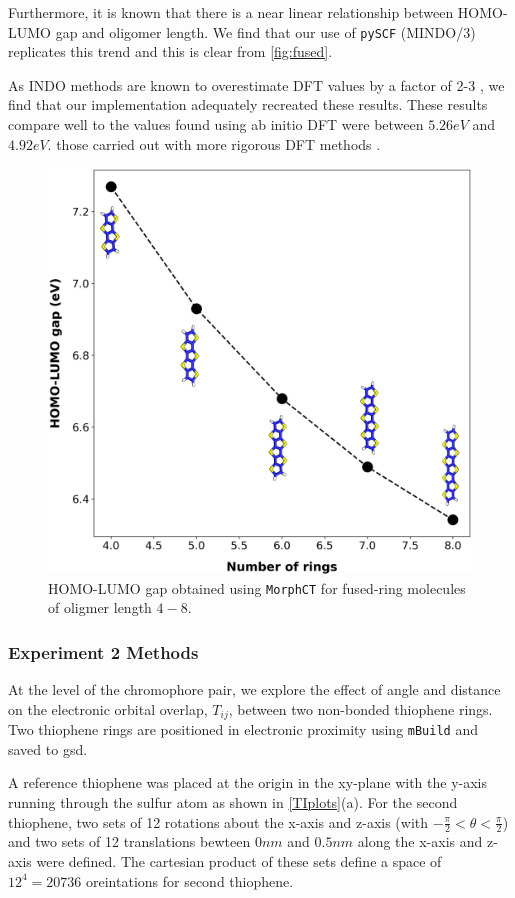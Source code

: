 Furthermore, it is known that there is a near linear
relationship between HOMO-LUMO gap and oligomer length. We find that our use of \texttt{pySCF} (MINDO/3) replicates
this trend and this is clear from \autoref{fig:fused}.

As INDO methods are known to overestimate DFT values by a factor of 2-3 \cite{Gorelsky2001}, we find that our
implementation adequately recreated these results.
These results compare well to the values found using ab initio DFT were between $5.26eV$ and $4.92eV$. 
 those carried out with more rigorous DFT methods \cite{Arago2010}.

\begin{figure}
  \center
  \includegraphics[width = .6\textwidth]{figures/fused-ring-figure.png}
  \caption{HOMO-LUMO gap obtained using \texttt{MorphCT} for fused-ring molecules of oligmer length $4-8$.}
  \label{fig:fused}
\end{figure}

\subsubsection{Experiment 2 Methods}

At the level of the chromophore pair, we explore the effect of angle and distance on the electronic orbital
overlap, $T_{ij}$, between two non-bonded thiophene rings.
Two thiophene rings are positioned in electronic proximity using \texttt{mBuild} and saved to gsd. 

A reference thiophene was placed at the origin in the xy-plane
with the y-axis running through the sulfur atom as shown in \autoref{TIplots}(a). For the second thiophene,
two sets of 12 rotations about the x-axis and z-axis (with $- \frac{\pi}{2} < \theta< \frac{\pi}{2}$)
and two sets of 12 translations bewteen $0nm$ and $0.5nm$ along the x-axis and z-axis were defined.
The cartesian product of these sets define a space of $12^{4}= 20736$ oreintations for second thiophene. 

